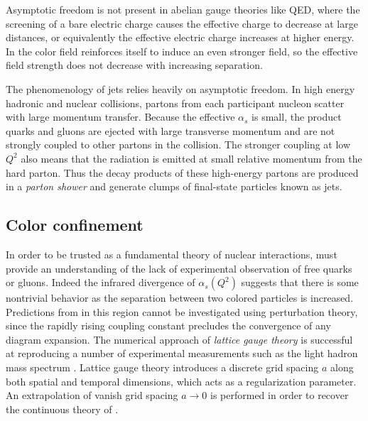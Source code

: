 Asymptotic freedom is not present in abelian gauge theories like \ac{QED}, where the screening of a bare electric charge causes the effective charge to decrease at large distances, or equivalently the effective electric charge increases at higher energy.
In \qcd the color field reinforces itself to induce an even stronger field, so the effective field strength does not decrease with increasing separation.

The phenomenology of jets relies heavily on asymptotic freedom.
In high energy hadronic and nuclear collisions, partons from each participant nucleon scatter with large momentum transfer.
Because the effective $\alpha_s$ is small, the product quarks and gluons are ejected with large transverse momentum and are not strongly coupled to other partons in the collision.
The stronger coupling at low $Q^2$ also means that the \qcd radiation is emitted at small relative momentum from the hard parton.
Thus the decay products of these high-energy partons are produced in a \emph{parton shower} and generate clumps of final-state particles known as jets.

\subsection{Color confinement}

In order to be trusted as a fundamental theory of nuclear interactions, \qcd must provide an understanding of the lack of experimental observation of free quarks or gluons.
Indeed the infrared divergence of $\alpha_s(Q^2)$ suggests that there is some nontrivial behavior as the separation between two colored particles is increased.
Predictions from \qcd in this region cannot be investigated using perturbation theory, since the rapidly rising coupling constant precludes the convergence of any diagram expansion.
The numerical approach of \emph{lattice gauge theory} \cite{Aoki:2016frl} is successful at reproducing a number of experimental measurements such as the light hadron mass spectrum \cite{Durr:2008zz}.
Lattice gauge theory introduces a discrete grid spacing $a$ along both spatial and temporal dimensions, which acts as a regularization parameter.
An extrapolation of vanish grid spacing $a \rightarrow 0$ is performed in order to recover the continuous theory of \qcd.


